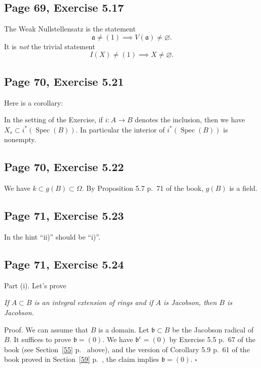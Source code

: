 \documentclass[parskip=half,fontsize=12pt]{scrartcl}%
\newcommand{\oo}{\operatorname}\newcommand{\ooo}{\operatorname*}
\newcommand{\mf}{\mathfrak}
\newcommand{\Spec}{\operatorname{Spec}}\newcommand{\Sp}{\operatorname{Spec}}
\begin{document}
\subsection{Page 69, Exercise 5.17}%

The Weak Nullstellensatz is the statement
$$
\mf a\ne(1)\implies V(\mf a)\ne\varnothing.
$$ 
It is \emph{not} the trivial statement 
$$
I(X)\ne(1)\implies X\ne\varnothing.
$$ 

\subsection{Page 70, Exercise 5.21}\label{522}%

Here is a corollary:

In the setting of the Exercise, if $i:A\to B$ denotes the inclusion, then we have $X_s\subset i^*(\Spec(B))$. In particular the interior of $i^*(\Spec(B))$ is nonempty. 

\subsection{Page 70, Exercise 5.22}%

We have $k\subset g(B)\subset\Omega$. By Proposition 5.7 p.~71 of the book, $g(B)$ is a field.

\subsection{Page 71, Exercise 5.23}%

In the hint ``ii)'' should be ``i)''.

\subsection{Page 71, Exercise 5.24}%
 
Part (i). Let's prove %

\emph{If $A\subset B$ is an integral extension of rings and if $A$ is Jacobson, then $B$ is Jacobson.}

Proof. %
We can assume that $B$ is a domain. Let $\mf b\subset B$ be the Jacobson radical of $B$. It suffices to prove $\mf b=(0)$. We have %
$\mf b^{\oo c}=(0)$ by Exercise 5.5 p.~67 of the book (see Section~\ref{55} p.~\pageref{55} above), and %
the version of Corollary 5.9 p.~61 of the book proved in Section~\ref{59} p.~\pageref{59}, the claim implies $\mf b=(0)$. $\square$
\end{document}
